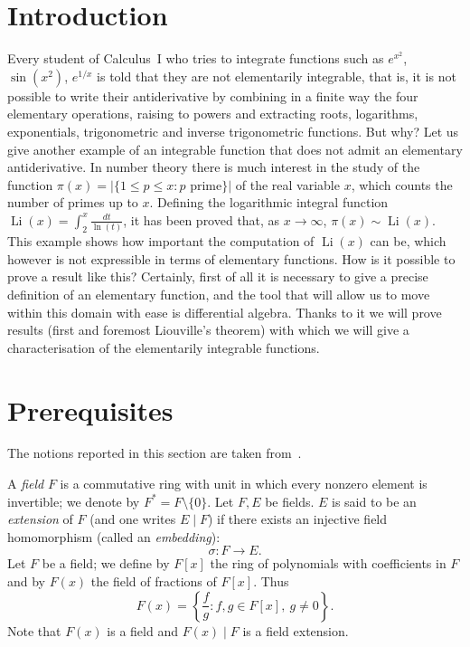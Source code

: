 \documentclass[11pt]{article}
\theoremstyle{plain}
\theoremstyle{definition}
\theoremstyle{remark}
\newcommand{\Li}{\operatorname{Li}}
\begin{document}
\renewcommand{\contentsname}{Contents}
\tableofcontents
\newpage

\section{Introduction}
Every student of Calculus~I who tries to integrate functions such as
$e^{x^2}$, $\sin(x^2)$, $e^{1/x}$ is told that they are not
elementarily integrable, that is, it is not possible to write their
antiderivative by combining in a finite way the four elementary
operations, raising to powers and extracting roots, logarithms,
exponentials, trigonometric and inverse trigonometric functions. But
why? Let us give another example of an integrable function that does
not admit an elementary antiderivative. In number theory there is much
interest in the study of the function
$\pi(x) = |\{1 \le p \le x : p \text{ prime}\}|$ of the real variable
$x$, which counts the number of primes up to $x$. Defining the
logarithmic integral function $\Li(x) = \int_{2}^{x} \frac{dt}{\ln(t)}$,
it has been proved that, as $x \to \infty$, $\pi(x) \sim \Li(x)$. This
example shows how important the computation of $\Li(x)$ can be, which
however is not expressible in terms of elementary functions. How is it
possible to prove a result like this? Certainly, first of all it is
necessary to give a precise definition of an elementary function, and
the tool that will allow us to move within this domain with ease is
differential algebra. Thanks to it we will prove results (first and
foremost Liouville's theorem) with which we will give a
characterisation of the elementarily integrable functions.

\section{Prerequisites}
The notions reported in this section are taken from~\cite{Casolo}.

A \emph{field} $F$ is a commutative ring with unit in which every
nonzero element is invertible; we denote by $F^{*} = F \setminus \{0\}$.
Let $F, E$ be fields. $E$ is said to be an \emph{extension} of $F$
(and one writes $E\mid F$) if there exists an injective field
homomorphism (called an \emph{embedding}):
\[
\sigma : F \longrightarrow E.
\]
Let $F$ be a field; we define by $F[x]$ the ring of polynomials with
coefficients in $F$ and by $F(x)$ the field of fractions of $F[x]$.
Thus
\[
F(x) = \left\{ \frac{f}{g} : f, g \in F[x],\ g \neq 0 \right\}.
\]
Note that $F(x)$ is a field and $F(x)\mid F$ is a field extension.
\end{document}
